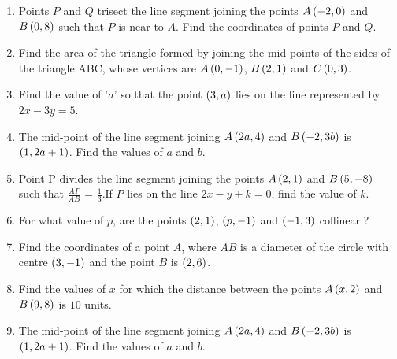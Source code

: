 \begin{enumerate}
\item Points $P$ and $Q$ trisect the line segment joining the points $A\left(-2, 0\right)$ and $B\left(0, 8\right)$ such that $P$ is near to $A$. Find the coordinates of points $P$ and $Q$.

\item Find the area of the triangle formed by joining the mid-points of the sides of the triangle ABC, whose vertices are $A\left(0, - 1\right)$, $B\left(2, 1\right)$ and $C\left(0, 3\right)$.


\item Find the value of '$a$' so that the point $\left(3, a\right)$ lies on the line represented
by $2 x - 3 y = 5$.

\item The mid-point of the line segment joining $A\left(2a, 4\right)$ and $B\left(-2, 3b\right)$ is $\left(1, 2a + 1\right)$. Find the values of $a$ and $b$.

\item Point P divides the line segment joining the points $A\left(2, 1\right)$ and $B\left(5, -8\right)$ such that $\frac{AP}{AB}$ = $\frac{1}{3}$.If $P$ lies on the line $2x - y + k = 0$, find the value of $k$.

\item For what value of $p$, are the points $\left(2, 1\right)$, $\left(p,- 1\right)$ and $\left(- 1, 3\right)$ collinear ?

\item Find the coordinates of a point $A$, where $AB$ is a diameter of the circle with centre $\left(3, -1\right)$ and the point $B$ is $\left(2, 6\right)$.

\item Find the values of $x$ for which the distance between the points $A\left(x, 2\right)$ and $B\left(9, 8\right)$ is $10$ units.

\item The mid-point of the line segment joining $A\left(2a, 4\right)$ and $B\left(-2, 3b\right)$ is $\left(1, 2a + 1\right)$. Find the values of $a$ and $b$.



\end{enumerate}
